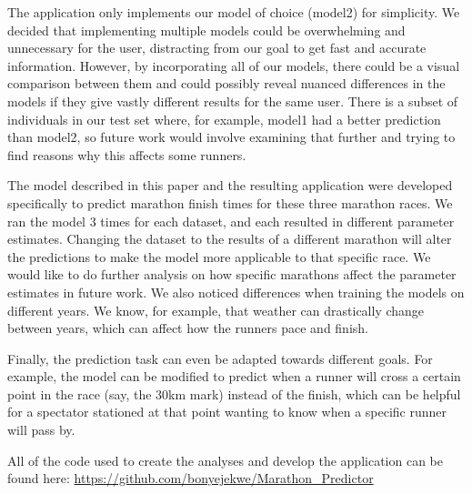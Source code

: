 \documentclass[USenglish,twocolumn]{article}
\theoremstyle{dgthm}
\theoremstyle{dgdef}
\begin{document}
The application only implements our model of choice (model2) for simplicity. We decided that implementing multiple models could be overwhelming and unnecessary for the user, distracting from our goal to get fast and accurate information. However, by incorporating all of our models, there could be a visual comparison between them and could possibly reveal nuanced differences in the models if they give vastly different results for the same user. There is a subset of individuals in our test set where, for example, model1 had a better prediction than model2, so future work would involve examining that further and trying to find reasons why this affects some runners.

The model described in this paper and the resulting application were developed specifically to predict marathon finish times for these three marathon races. We ran the model 3 times for each dataset, and each resulted in different parameter estimates. Changing the dataset to the results of a different marathon will alter the predictions to make the model more applicable to that specific race. We would like to do further analysis on how specific marathons affect the parameter estimates in future work. We also noticed differences when training the models on different years. We know, for example, that weather can drastically change between years, which can affect how the runners pace and finish.

Finally, the prediction task can even be adapted towards different goals. For example, the model can be modified to predict when a runner will cross a certain point in the race (say, the 30km mark) instead of the finish, which can be helpful for a spectator stationed at that point wanting to know when a specific runner will pass by. 

All of the code used to create the analyses and develop the application can be found here: \url{https://github.com/bonyejekwe/Marathon_Predictor}
\end{document}
